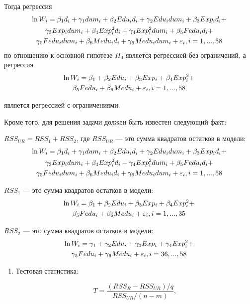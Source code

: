 \documentclass[pdftex,11pt,openany]{book}\usepackage[]{graphicx}\usepackage[]{color}
\begin{document}
\begin{solution}
Тогда регрессия
\begin{multline}
\ln W_i=\beta_1 d_i+\gamma_1 dum_i+\beta_2 Edu_i d_i+\gamma_2 Edu_i dum_i+\beta_3 Exp_i d_i+\\
\gamma_3 Exp_i dum_i+\beta_4 Exp_i^2 d_i+
\gamma_4 Exp_i^2 dum_i+\beta_5 Fedu_i d_i +\\
\gamma_5 Fedu_i dum_i+\beta_6 Medu_i d_i+\gamma_6 Medu_i dum_i+\varepsilon_i, i=1,...,58
\end{multline}
по отношению к основной гипотезе $H_0$ является регрессией без ограничений, а регрессия 
\begin{multline}
\ln W_i=\beta_1 +\beta_2 Edu_i+\beta_3 Exp_i+\beta_4 Exp_i^2+\\
\beta_5 Fedu_i+\beta_6 Medu_i+\varepsilon_i, i=1,...,58 
\end{multline}

является регрессией с ограничениями.

Кроме того, для решения задачи должен быть известен следующий факт:

$RSS_{UR}=RSS_1+RSS_2$, где $RSS_{UR}$ --- это сумма квадратов остатков в модели:
\begin{multline}
\ln W_i=\beta_1  d_i+\gamma_1 dum_i+\beta_2 Edu_i d_i+\gamma_2 Edu_i dum_i+\beta_3 Exp_i d_i+\\
\gamma_3 Exp_i dum_i+\beta_4 Exp_i^2 d_i
+ \gamma_4 Exp_i^2 dum_i+\beta_5 Fedu_i d _i +\\
\gamma_5 Fedu_i dum_i+\beta_6 Medu_i d_i+\gamma_6 Medu_i dum_i+\varepsilon_i, i=1,...,58
\end{multline}

$RSS_1$ --- это сумма квадратов остатков в модели:
\begin{multline}
\ln W_i=\beta_1 +\beta_2 Edu_i+\beta_3 Exp_i+\beta_4 Exp_i^2+\\
\beta_5 Fedu_i+\beta_6 Medu_i+\varepsilon_i, i=1,...,35
\end{multline}

$RSS_2$ --- это сумма квадратов остатков в модели:
\begin{multline}
\ln W_i=\gamma_1 +\gamma_2 Edu_i+\gamma_3 Exp_i+\gamma_4 Exp_i^2+\\
\gamma_5 Fedu_i+\gamma_6 Medu_i+\varepsilon_i, i=36,...,58
\end{multline}


\begin{enumerate}
\item Тестовая статистика:

\[
T = \frac{(RSS_R-RSS_{UR})/q}{RSS_{UR}/(n-m)},
\]


\end{enumerate}
\end{solution}
\end{document}
